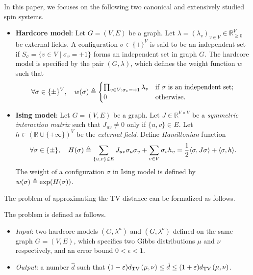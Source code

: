 In this paper,
we focuses on the following two canonical and extensively studied spin systems. 
\begin{itemize}
    \item \textbf{Hardcore model}: Let $G = (V,E)$ be a graph. Let $\lambda = (\lambda_v)_{v \in V} \in \mathbb{R}_{\geq 0}^V$ be external fields. A configuration $\sigma \in \{\pm\}^V$ is said to be an independent set if $S_\sigma = \{v \in V \mid \sigma_v = +1\}$ forms an independent set in graph $G$. 
The hardcore model is specified by the pair $(G,\lambda)$, which defines the weight function $w$ such that
\begin{align*}
   \forall \sigma \in \{\pm\}^V, \quad w(\sigma) \triangleq \begin{cases}
   \prod_{v \in V:\sigma_v = +1}\lambda_v &\text{if $\sigma$ is an independent set};\\
   0 &\text{otherwise}.
   \end{cases}
\end{align*}
    \item \textbf{Ising model}: Let $G = (V,E)$ be a graph. Let $J \in \mathbb{R}^{V \times V}$ be a \emph{symmetric interaction matrix} such that $J_{uv} \neq 0$ only if $\{u,v\} \in E$. Let $h \in (\mathbb{R} \cup \{\pm \infty\})^V$ be the \emph{external field}. Define \emph{Hamiltonian} function
  \begin{align*}
  \forall \sigma \in \{\pm\},\quad   H(\sigma) \triangleq \sum_{\{u,v\} \in E} J_{uv}\sigma_u\sigma_v + \sum_{v \in V}\sigma_v h_v = \frac{1}{2}\langle \sigma, J\sigma \rangle + \langle \sigma, h \rangle.
  \end{align*}
The weight of a configuration $\sigma$ in Ising model is defined by $w(\sigma) \triangleq \exp(H(\sigma))$.
\end{itemize}
The problem of approximating the TV-distance can be formalized as follows.
\begin{problem}\label{label:prob-hardcore} The problem is defined as follows.
\begin{itemize}
    \item \emph{Input}: two hardcore models $(G,\lambda^\mu)$ and $(G,\lambda^\nu)$ defined on the same graph $G = (V,E)$, which specifies two Gibbs distributions $\mu$ and $\nu$ respectively, and an error bound $0<\epsilon<1$.
    \item \emph{Output}: a number $\hat{d}$ such that $(1-\varepsilon) d_{\mathrm{TV}}\left({\mu},{\nu}\right) \leq \hat{d} \leq (1 + \varepsilon)d_{\mathrm{TV}}\left({\mu},{\nu}\right)$.%
\end{itemize}
\end{problem}

